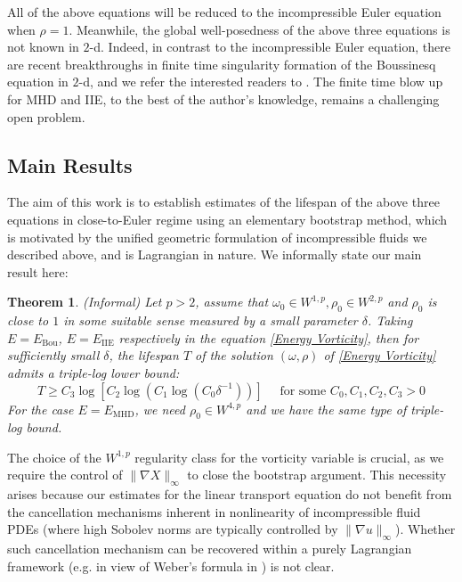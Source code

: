 \documentclass[12pt,letterpaper]{article}
\newtheorem{thm}{Theorem}[section]
\theoremstyle{plain}
\begin{document}
All of the above equations will be reduced to the incompressible Euler equation when $\rho=1$. Meanwhile, the global well-posedness of the above three equations is not known in $2$-d. Indeed, in contrast to the incompressible Euler equation, there are recent breakthroughs in finite time singularity formation of the Boussinesq equation in $2$-d, and we refer the interested readers to \cite{ElgindiPasqualotto2023}\cite{[EP25]}. The finite time blow up for MHD and IIE, to the best of the author's knowledge, remains a challenging open problem.

\subsection{Main Results}
The aim of this work is to establish estimates of the lifespan of the above three equations in close-to-Euler regime using an elementary bootstrap method, which is motivated by the  unified geometric formulation of incompressible fluids we described above, and is Lagrangian in nature. We informally state our main result here:
\begin{thm}\label{Lifespan of 2d Fluids}
   (Informal) Let $p>2$, assume that $\omega_0\in W^{1,p},\rho_0\in W^{2,p}$ and $\rho_0$ is close to $1$ in some suitable sense measured by a small parameter $\delta$. Taking $E=E_{\text{Bou}}$, $E= E_{\text{IIE}}$  respectively in the equation \eqref{Energy Vorticity}, then for sufficiently small $\delta$, the lifespan $T$ of the solution $(\omega,\rho)$ of \eqref{Energy Vorticity} admits a triple-log lower bound:
   \begin{equation}\label{Lifespan Lowerbound for Fluid PDEs}
      T\ge C_3\log [C_2\log (C_1\log (C_0\delta^{-1}))]\quad\text{ for some }C_0,C_1,C_2,C_3>0 
   \end{equation}
   For the case $E=E_{\text{MHD}}$, we need $\rho_0\in W^{4,p}$ and we have the same type of triple-log bound.
\end{thm}

The choice of the $W^{1,p}$ regularity class for the vorticity variable is crucial, as we require the control of $\lVert \nabla X \rVert_\infty$ to close the bootstrap argument. This necessity arises because our estimates for the linear transport equation do not benefit from the cancellation mechanisms inherent in nonlinearity of incompressible fluid PDEs (where high Sobolev norms are typically controlled by $\lVert \nabla u \rVert_\infty$). Whether such cancellation mechanism can be recovered within a purely Lagrangian framework (e.g. in view of Weber's formula in \cite{Co01}) is not clear.
\end{document}
